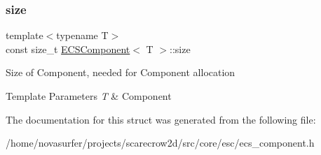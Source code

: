 \subsubsection{\texorpdfstring{size}{size}}
{\footnotesize\ttfamily template$<$typename T$>$ \\
const size\+\_\+t \hyperlink{structECSComponent}{E\+C\+S\+Component}$<$ T $>$\+::size\hspace{0.3cm}{\ttfamily [static]}}

Size of Component, needed for Component allocation 
\begin{DoxyTemplParams}{Template Parameters}
{\em T} & Component \\
\hline
\end{DoxyTemplParams}


The documentation for this struct was generated from the following file\+:\begin{DoxyCompactItemize}
\item 
/home/novasurfer/projects/scarecrow2d/src/core/esc/ecs\+\_\+component.\+h\end{DoxyCompactItemize}
